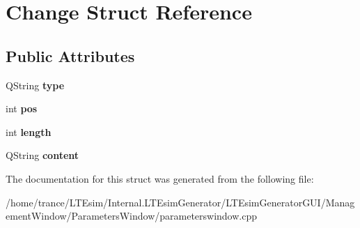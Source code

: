 \hypertarget{struct_change}{}\section{Change Struct Reference}
\label{struct_change}
\subsection*{Public Attributes}
\begin{DoxyCompactItemize}
\item 
Q\+String {\bfseries type}\hypertarget{struct_change_a540497453596308a68e15532ca23ffd1}{}\label{struct_change_a540497453596308a68e15532ca23ffd1}

\item 
int {\bfseries pos}\hypertarget{struct_change_a8328d66176b9af8693380b9d790ed055}{}\label{struct_change_a8328d66176b9af8693380b9d790ed055}

\item 
int {\bfseries length}\hypertarget{struct_change_ab60176801fef8803c8e4e93b3096e4c8}{}\label{struct_change_ab60176801fef8803c8e4e93b3096e4c8}

\item 
Q\+String {\bfseries content}\hypertarget{struct_change_ac738ff8bc630d9955a213177065618d4}{}\label{struct_change_ac738ff8bc630d9955a213177065618d4}

\end{DoxyCompactItemize}


The documentation for this struct was generated from the following file\+:\begin{DoxyCompactItemize}
\item 
/home/trance/\+L\+T\+Esim/\+Internal.\+L\+T\+Esim\+Generator/\+L\+T\+Esim\+Generator\+G\+U\+I/\+Management\+Window/\+Parameters\+Window/parameterswindow.\+cpp\end{DoxyCompactItemize}
